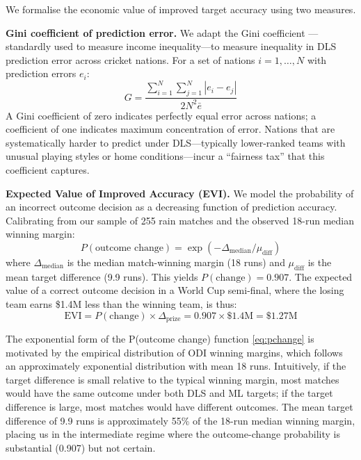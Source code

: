 \documentclass[10pt,a4paper,twocolumn]{article}
\begin{document}
We formalise the economic value of improved target accuracy using two measures.

\textbf{Gini coefficient of prediction error.} We adapt the Gini coefficient \citep{Gini1912}---standardly used to measure income inequality---to measure inequality in DLS prediction error across cricket nations. For a set of nations $i = 1, \ldots, N$ with prediction errors $e_i$:
\begin{equation}
G = \frac{\sum_{i=1}^{N} \sum_{j=1}^{N} |e_i - e_j|}{2N^2 \bar{e}}
\label{eq:gini}
\end{equation}
A Gini coefficient of zero indicates perfectly equal error across nations; a coefficient of one indicates maximum concentration of error. Nations that are systematically harder to predict under DLS---typically lower-ranked teams with unusual playing styles or home conditions---incur a ``fairness tax'' that this coefficient captures.

\textbf{Expected Value of Improved Accuracy (EVI).} We model the probability of an incorrect outcome decision as a decreasing function of prediction accuracy. Calibrating from our sample of 255 rain matches and the observed 18-run median winning margin:
\begin{equation}
P(\text{outcome change}) = \exp(-\Delta_{\text{median}} / \mu_{\text{diff}})
\label{eq:pchange}
\end{equation}
where $\Delta_{\text{median}}$ is the median match-winning margin (18 runs) and $\mu_{\text{diff}}$ is the mean target difference (9.9 runs). This yields $P(\text{change}) = 0.907$. The expected value of a correct outcome decision in a World Cup semi-final, where the losing team earns \$1.4M less than the winning team, is thus:
\begin{equation}
\text{EVI} = P(\text{change}) \times \Delta_{\text{prize}} = 0.907 \times \$1.4\text{M} = \$1.27\text{M}
\label{eq:evi}
\end{equation}

The exponential form of the P(outcome change) function \eqref{eq:pchange} is motivated by the empirical distribution of ODI winning margins, which follows an approximately exponential distribution with mean 18 runs. Intuitively, if the target difference is small relative to the typical winning margin, most matches would have the same outcome under both DLS and ML targets; if the target difference is large, most matches would have different outcomes. The mean target difference of 9.9 runs is approximately 55\% of the 18-run median winning margin, placing us in the intermediate regime where the outcome-change probability is substantial (0.907) but not certain.
\end{document}
